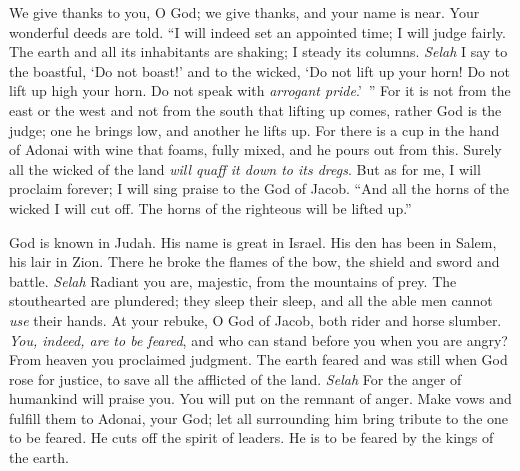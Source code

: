 \begin{biblechapter} %
 We give thanks to you, O God; 
we give thanks, and your name is near. 
Your wonderful deeds are told.
\verse “I will indeed set an appointed time; 
I will judge fairly.
\verse The earth and all its inhabitants are shaking; 
I steady its columns. \textit{Selah}
\verse I say to the boastful, ‘Do not boast!’ 
and to the wicked, ‘Do not lift up your horn!
\verse Do not lift up high your horn. 
Do not speak with \textit{arrogant pride}.’ ”
\verse For it is not from the east or the west 
and not from the south that lifting up comes,
\verse rather God is the judge; 
one he brings low, and another he lifts up.
\verse For there is a cup in the hand of Adonai 
with wine that foams, fully mixed, 
and he pours out from this. 
Surely all the wicked of the land 
\textit{will quaff it down to its dregs}. 
\verse But as for me, I will proclaim forever; 
I will sing praise to the God of Jacob.
\verse “And all the horns of the wicked I will cut off. 
The horns of the righteous will be lifted up.”
\end{biblechapter}

\begin{biblechapter} %
 God is known in Judah. 
His name is great in Israel.
\verse His den has been in Salem, 
his lair in Zion.
\verse There he broke the flames of the bow, 
the shield and sword and battle. \textit{Selah}
\verse Radiant you are, majestic, 
from the mountains of prey.
\verse The stouthearted are plundered; 
they sleep their sleep, 
and all the able men cannot \textit{use} their hands.
\verse At your rebuke, O God of Jacob, 
both rider and horse slumber.
\verse \textit{You, indeed, are to be feared}, 
and who can stand before you 
when you are angry? 
\verse From heaven you proclaimed judgment. 
The earth feared and was still
\verse when God rose for justice, 
to save all the afflicted of the land. \textit{Selah}
\verse For the anger of humankind will praise you. 
You will put on the remnant of anger.
\verse Make vows and fulfill them to Adonai, your God; 
let all surrounding him 
bring tribute to the one to be feared.
\verse He cuts off the spirit of leaders. 
He is to be feared by the kings of the earth.
\end{biblechapter}

